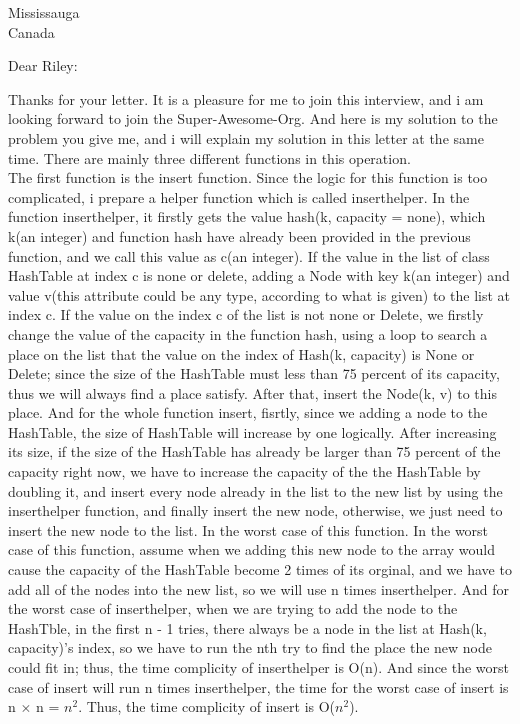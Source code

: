 \documentclass{letter}
\begin{document}
\begin{letter}{Mississauga \\ Canada}
\opening{Dear Riley:}
Thanks for your letter. It is a pleasure for me to join this interview, and i am looking forward to join the Super-Awesome-Org. And here is my solution to the problem you give me, and i will explain my solution in this letter at the same time. There are mainly three different functions in this operation.
\\ The first function is the insert function. Since the logic for this function is too complicated, i prepare a helper function which is called inserthelper. In the function inserthelper, it firstly gets the value hash(k, capacity = none), which k(an integer) and function hash have already been provided in the previous function, and we call this value as c(an integer). If the value in the list of class HashTable at index c is none or delete, adding a Node with key k(an integer) and value v(this attribute could be any type, according to what is given) to the list at index c. If the value on the index c of the list is not none or Delete, we firstly change the value of the capacity in the function hash, using a loop to search a place on the list that the value on the index of Hash(k, capacity) is None or Delete; since the size of the HashTable must less than 75 percent of its capacity, thus we will always find a place satisfy. After that, insert the Node(k, v) to this place. And for the whole function insert,  fisrtly, since we adding a node to the HashTable, the size of HashTable will increase by one logically. After increasing its size, if the size of the HashTable has already be larger than 75 percent of the capacity right now, we have to increase the capacity of the the HashTable by doubling it, and insert every node already in the list to the new list by using the inserthelper function, and finally insert the new node, otherwise, we just need to insert the new node to the list. In the worst case of this function. In the worst case of this function, assume when we adding this new node to the array would cause the capacity of the HashTable become 2 times of its orginal, and we have to add all of the nodes into the new list, so we will use n times inserthelper. And for the worst case of inserthelper, when we are trying to add the node to the HashTble, in the first n - 1 tries, there always be a node in the list at Hash(k, capacity)'s index, so we have to run the nth try to find the place the new node could fit in; thus, the time complicity of inserthelper is O(n). And since the worst case of insert will run n times inserthelper, the time for the worst case of insert is n $\times$ n = $n^2$. Thus, the time complicity of insert is O($n^2$).

\end{letter}
\end{document}
